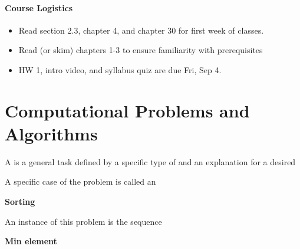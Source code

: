 \documentclass[11  pt]{article}
\begin{document}
\onehalfspacing


\paragraph{Course Logistics}

\begin{itemize}
\item Read section 2.3, chapter 4, and chapter 30 for first week of classes.
\item Read (or skim) chapters 1-3 to ensure familiarity with prerequisites
\item HW 1, intro video, and syllabus quiz are due Fri, Sep 4.
\end{itemize}

\section{Computational Problems and Algorithms}

\begin{definition} \noindent A  is a general task defined by a specific type of  and an explanation for a desired  
\end{definition}

\vs{.5cm}

\noindent A specific case of the problem is called an 

\begin{example}\textbf{Sorting} \\


An instance of this problem is the sequence %
\end{example}
\begin{example}\textbf{Min element} \\
	
	\vs{5pt}
\end{example}
\end{document}
